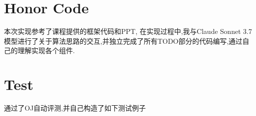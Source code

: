 \documentclass[a4paper,twoside]{article}
\begin{document}
\section{Honor Code}
本次实现参考了课程提供的框架代码和PPT, 在实现过程中,我与Claude Sonnet 3.7模型进行了关于算法思路的交互,并独立完成了所有TODO部分的代码编写,通过自己的理解实现各个组件.
\section{Test}
通过了OJ自动评测,并自己构造了如下测试例子
\end{document}
